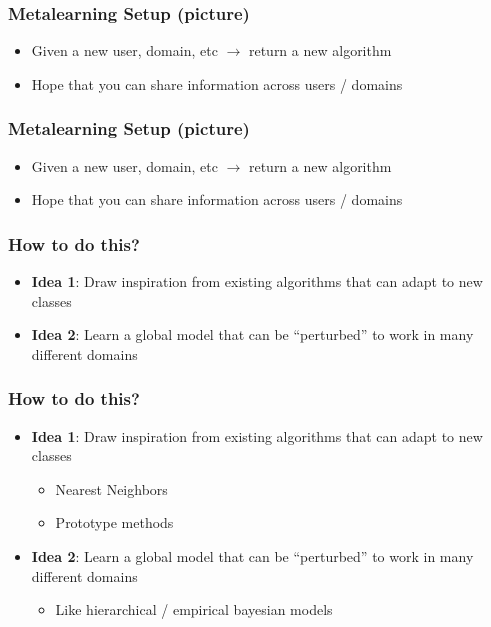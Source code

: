 \documentclass[10pt,mathserif]{beamer}
\begin{document}
\begin{frame}
  \frametitle{Metalearning Setup (picture)}
  \begin{itemize}
  \item Given a new user, domain, etc $\rightarrow$ return a new algorithm
  \item Hope that you can share information across users / domains
  \end{itemize}
  \begin{figure}[ht]
    \centering
    \caption{\label{fig:metalearning_setup_boxes}}
  \end{figure}
\end{frame}

\begin{frame}
  \frametitle{Metalearning Setup (picture)}
\begin{itemize}
\item Given a new user, domain, etc $\rightarrow$ return a new algorithm
\item Hope that you can share information across users / domains
\end{itemize}
 \begin{figure}[ht]
   \centering
   \caption{\label{fig:metalearning_setup_curves} }
 \end{figure}
\end{frame}

\begin{frame}
  \frametitle{How to do this?}
  \begin{itemize}
  \item \textbf{Idea 1}: Draw inspiration from existing algorithms that can
    adapt to new classes
  \item \textbf{Idea 2}: Learn a global model that can be ``perturbed'' to work
    in many different domains
  \end{itemize}
\end{frame}

\begin{frame}
  \frametitle{How to do this?}
  \begin{itemize}
  \item \textbf{Idea 1}: Draw inspiration from existing algorithms that can
    adapt to new classes
    \begin{itemize}
    \item Nearest Neighbors
    \item Prototype methods
    \end{itemize}
  \item \textbf{Idea 2}: Learn a global model that can be ``perturbed'' to work
    in many different domains
    \begin{itemize}
    \item Like hierarchical / empirical bayesian models
    \end{itemize}
  \end{itemize}
\end{frame}
\end{document}

